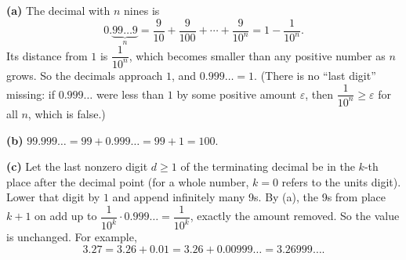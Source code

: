 \textbf{(a)} The decimal with $n$ nines is
\[0.\underbrace{99\ldots9}_{n}=\dfrac{9}{10}+\dfrac{9}{100}+\cdots+\dfrac{9}{10^n}=1-\dfrac{1}{10^n}.\]
Its distance from $1$ is $\dfrac{1}{10^n}$, which becomes smaller than any positive number as $n$ grows. So the decimals approach $1$, and $0.999\ldots=1$. (There is no ``last digit'' missing: if $0.999\ldots$ were less than $1$ by some positive amount $\varepsilon$, then $\dfrac{1}{10^n}\ge\varepsilon$ for all $n$, which is false.)

\textbf{(b)} $99.999\ldots=99+0.999\ldots=99+1=100$.

\textbf{(c)} Let the last nonzero digit $d\ge1$ of the terminating decimal be in the $k$-th place after the decimal point (for a whole number, $k=0$ refers to the units digit). Lower that digit by $1$ and append infinitely many 9s. By (a), the 9s from place $k+1$ on add up to $\dfrac{1}{10^k}\cdot0.999\ldots=\dfrac{1}{10^k}$, exactly the amount removed. So the value is unchanged. For example,
\[3.27=3.26+0.01=3.26+0.00999\ldots=\boxed{3.26999\ldots}.\]
